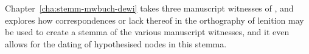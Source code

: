Chapter~\ref{cha:stemm-mwbuch-dewi} takes three manuscript witnesses of , and explores how correspondences or lack thereof in the orthography of lenition may be used to create a stemma of the various manuscript witnesses, and it even allows for the dating of hypothesised nodes in this stemma. 




